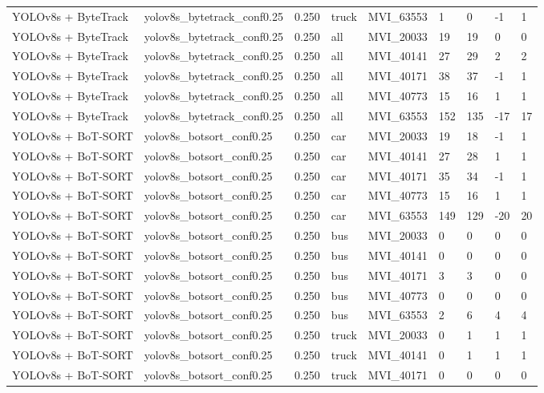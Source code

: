 \begin{tabular}{lllllllll}
YOLOv8s + ByteTrack & yolov8s\_bytetrack\_conf0.25 & 0.250 & truck & MVI\_63553 & 1 & 0 & -1 & 1 \\
YOLOv8s + ByteTrack & yolov8s\_bytetrack\_conf0.25 & 0.250 & all & MVI\_20033 & 19 & 19 & 0 & 0 \\
YOLOv8s + ByteTrack & yolov8s\_bytetrack\_conf0.25 & 0.250 & all & MVI\_40141 & 27 & 29 & 2 & 2 \\
YOLOv8s + ByteTrack & yolov8s\_bytetrack\_conf0.25 & 0.250 & all & MVI\_40171 & 38 & 37 & -1 & 1 \\
YOLOv8s + ByteTrack & yolov8s\_bytetrack\_conf0.25 & 0.250 & all & MVI\_40773 & 15 & 16 & 1 & 1 \\
YOLOv8s + ByteTrack & yolov8s\_bytetrack\_conf0.25 & 0.250 & all & MVI\_63553 & 152 & 135 & -17 & 17 \\
YOLOv8s + BoT-SORT & yolov8s\_botsort\_conf0.25 & 0.250 & car & MVI\_20033 & 19 & 18 & -1 & 1 \\
YOLOv8s + BoT-SORT & yolov8s\_botsort\_conf0.25 & 0.250 & car & MVI\_40141 & 27 & 28 & 1 & 1 \\
YOLOv8s + BoT-SORT & yolov8s\_botsort\_conf0.25 & 0.250 & car & MVI\_40171 & 35 & 34 & -1 & 1 \\
YOLOv8s + BoT-SORT & yolov8s\_botsort\_conf0.25 & 0.250 & car & MVI\_40773 & 15 & 16 & 1 & 1 \\
YOLOv8s + BoT-SORT & yolov8s\_botsort\_conf0.25 & 0.250 & car & MVI\_63553 & 149 & 129 & -20 & 20 \\
YOLOv8s + BoT-SORT & yolov8s\_botsort\_conf0.25 & 0.250 & bus & MVI\_20033 & 0 & 0 & 0 & 0 \\
YOLOv8s + BoT-SORT & yolov8s\_botsort\_conf0.25 & 0.250 & bus & MVI\_40141 & 0 & 0 & 0 & 0 \\
YOLOv8s + BoT-SORT & yolov8s\_botsort\_conf0.25 & 0.250 & bus & MVI\_40171 & 3 & 3 & 0 & 0 \\
YOLOv8s + BoT-SORT & yolov8s\_botsort\_conf0.25 & 0.250 & bus & MVI\_40773 & 0 & 0 & 0 & 0 \\
YOLOv8s + BoT-SORT & yolov8s\_botsort\_conf0.25 & 0.250 & bus & MVI\_63553 & 2 & 6 & 4 & 4 \\
YOLOv8s + BoT-SORT & yolov8s\_botsort\_conf0.25 & 0.250 & truck & MVI\_20033 & 0 & 1 & 1 & 1 \\
YOLOv8s + BoT-SORT & yolov8s\_botsort\_conf0.25 & 0.250 & truck & MVI\_40141 & 0 & 1 & 1 & 1 \\
YOLOv8s + BoT-SORT & yolov8s\_botsort\_conf0.25 & 0.250 & truck & MVI\_40171 & 0 & 0 & 0 & 0 \\

\end{tabular}
